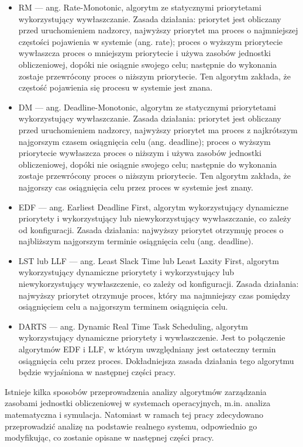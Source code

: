 \documentclass[../../main]{subfiles}
\begin{document}
\begin{itemize}
    \item RM — ang. Rate-Monotonic, algorytm ze statycznymi priorytetami wykorzystujący wywłaszczanie. Zasada działania: priorytet jest obliczany przed uruchomieniem nadzorcy, najwyższy priorytet ma proces o najmniejszej częstości pojawienia w systemie (ang. rate); proces o wyższym priorytecie wywłaszcza proces o mniejszym priorytecie i używa zasobów jednostki obliczeniowej, dopóki nie osiągnie swojego celu; następnie do wykonania zostaje przewrócony proces o niższym priorytecie. Ten algorytm zakłada, że częstość pojawienia się procesu w systemie jest znana.
    \item DM — ang. Deadline-Monotonic, algorytm ze statycznymi priorytetami wykorzystujący wywłaszczanie. Zasada działania: priorytet jest obliczany przed uruchomieniem nadzorcy, najwyższy priorytet ma proces z najkrótszym najgorszym czasem osiągnięcia celu (ang. deadline); proces o wyższym priorytecie wywłaszcza proces o niższym i używa zasobów jednostki obliczeniowej, dopóki nie osiągnie swojego celu; następnie do wykonania zostaje przewrócony proces o niższym priorytecie. Ten algorytm zakłada, że najgorszy cas osiągnięcia celu przez proces w systemie jest znany.
    \item EDF — ang. Earliest Deadline First, algorytm wykorzystujący dynamiczne priorytety i wykorzystujący lub niewykorzystujący wywłaszczanie, co zależy od konfiguracji. Zasada działania: najwyższy priorytet otrzymuję proces o najbliższym najgorszym terminie osiągnięcia celu (ang. deadline).
    \item LST lub LLF — ang. Least Slack Time lub Least Laxity First, algorytm wykorzystujący dynamiczne priorytety i wykorzystujący lub niewykorzystujący wywłaszczenie, co zależy od konfiguracji. Zasada działania: najwyższy priorytet otrzymuje proces, który ma najmniejszy czas pomiędzy osiągnięciem celu a najgorszym terminem osiągnięcia celu.
    \item DARTS — ang. Dynamic Real Time Task Scheduling, algorytm wykorzystujący dynamiczne priorytety i wywłaszczenie. Jest to połączenie algorytmów EDF i LLF, w którym uwzględniany jest ostateczny termin osiągnięcia celu przez proces. Dokładniejsza zasada działania tego algorytmu będzie wyjaśniona w następnej części pracy. \cite{darts}
\end{itemize}

Istnieje kilka sposobów przeprowadzenia analizy algorytmów zarządzania zasobami jednostki obliczeniowej w systemach operacyjnych, m.in. analiza matematyczna i symulacja. Natomiast w ramach tej pracy zdecydowano przeprowadzić analizę na podstawie realnego systemu, odpowiednio go modyfikując, co zostanie opisane w następnej części pracy.
\end{document}
